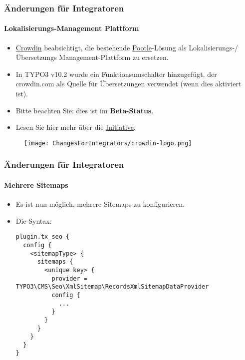 
\begin{frame}[fragile]
	\frametitle{Änderungen für Integratoren}
	\framesubtitle{Lokalisierungs-Management Plattform}

	\begin{itemize}

		\item \href{https://crowdin.com/}{Crowdin} beabsichtigt, die bestehende
			\href{https://translation.typo3.org/}{Pootle}-Lösung 
			 als Lokalisierungs-/Übersetzungs Management-Plattform zu ersetzen.

		\item In TYPO3 v10.2 wurde ein Funktionsumschalter hinzugefügt, der crowdin.com
			als Quelle für Übersetzungen verwendet (wenn dies aktiviert ist).

		\item Bitte beachten Sie: dies ist im \textbf{Beta-Status}.

		\item Lesen Sie hier mehr über die
			\href{https://typo3.org/community/teams/typo3-development/initiatives/localization-with-crowdin/}{Initiative}.

	\end{itemize}

	\begin{figure}
		\texttt{[image: ChangesForIntegrators/crowdin-logo.png]}
	\end{figure}

\end{frame}


\begin{frame}[fragile]
	\frametitle{Änderungen für Integratoren}
	\framesubtitle{Mehrere Sitemaps}

	\lstset{basicstyle=\tiny\ttfamily}

	\begin{itemize}

		\item Es ist nun möglich, mehrere Sitemaps zu konfigurieren.
		\item Die Syntax:
\begin{lstlisting}
plugin.tx_seo {
  config {
    <sitemapType> {
      sitemaps {
        <unique key> {
          provider = TYPO3\CMS\Seo\XmlSitemap\RecordsXmlSitemapDataProvider
          config {
            ...
          }
        }
      }
    }
  }
}
\end{lstlisting}

	\end{itemize}

\end{frame}

